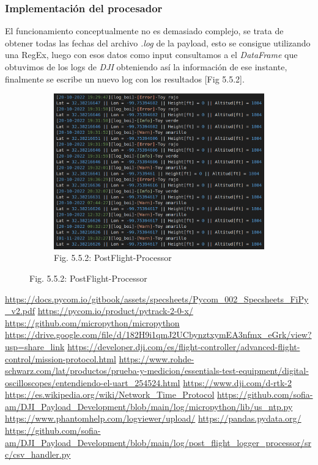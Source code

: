 \documentclass[12pt]{article}
\begin{document}
\subsubsection{Implementación del procesador}
El funcionamiento conceptualmente no es demasiado complejo, se trata de obtener todas las fechas del archivo \textit{.log} de la payload, esto se consigue utilizando una RegEx, luego con esos datos como input consultamos a el \textit{DataFrame} que obtuvimos de los logs de \textit{DJI} obteniendo así la información de ese instante, finalmente se escribe un nuevo log con los resultados [Fig 5.5.2].

\begin{figure}[ht]
  \centering
  \begin{subfigure}[a]{1\linewidth}
    \includegraphics[width=\linewidth]{images/post-flight-processor.png}
    \caption{Fig. 5.5.2: PostFlight-Processor}
  \end{subfigure}
\end{figure}

\clearpage
{}
\begin{thebibliography}{9}
 \url{https://docs.pycom.io/gitbook/assets/specsheets/Pycom_002_Specsheets_FiPy_v2.pdf}
 \url{https://pycom.io/product/pytrack-2-0-x/} 
 \url{https://github.com/micropython/micropython}
 \url{https://drive.google.com/file/d/182H9i1qmJ2UCbynztxymEA3nfmx_eGrk/view?usp=share_link}
 \url{https://developer.dji.com/es/flight-controller/advanced-flight-control/mission-protocol.html}
 \url{https://www.rohde-schwarz.com/lat/productos/prueba-y-medicion/essentials-test-equipment/digital-oscilloscopes/entendiendo-el-uart_254524.html} 
 \url{https://www.dji.com/d-rtk-2}
 \url{https://es.wikipedia.org/wiki/Network_Time_Protocol}
 \url{https://github.com/sofia-am/DJI_Payload_Development/blob/main/log/micropython/lib/us_ntp.py}
 \url{https://www.phantomhelp.com/logviewer/upload/}
 \url{https://pandas.pydata.org/}
 \url{https://github.com/sofia-am/DJI\_Payload\_Development/blob/main/log/post\_flight\_logger\_processor/src/csv\_handler.py}

\end{thebibliography}
\end{document}
